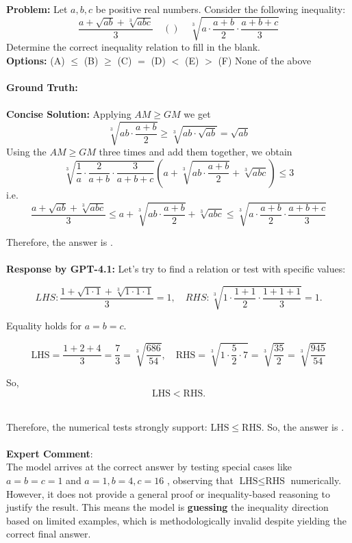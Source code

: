 \begin{examplebox}
\textbf{Problem:} Let $a, b, c$ be positive real numbers. Consider the following inequality:
$$
\frac{a+\sqrt{a b}+\sqrt[3]{a b c}}{3} \quad () \quad \sqrt[3]{a \cdot \frac{a+b}{2} \cdot \frac{a+b+c}{3}}
$$
Determine the correct inequality relation to fill in the blank.\\
\textbf{Options:} (A) $\leq$ \quad(B) $\geq$ \quad (C) $=$  \quad (D) $<$ \quad  (E) $>$  \quad (F) None of the above
\\\\
\textbf{Ground Truth:} 
\\\\
\textbf{Concise Solution:} Applying $A M \geq G M$ we get$$\sqrt[3]{a b \cdot \frac{a+b}{2}} \geq \sqrt[3]{a b \cdot \sqrt{a b}}=\sqrt{a b}$$
Using the $A M \geq G M$ three times and add them together, we obtain $$\sqrt[3]{\frac{1}{a} \cdot \frac{2}{a+b} \cdot \frac{3}{a+b+c}}\left(a+\sqrt[3]{a b \cdot \frac{a+b}{2}}+\sqrt[3]{a b c}\right) \leq 3$$
i.e.$$\frac{a+\sqrt{a b}+\sqrt[3]{a b c}}{3}\leq a+\sqrt[3]{a b \cdot \frac{a+b}{2}}+\sqrt[3]{a b c} \leq  \sqrt[3]{a \cdot \frac{a+b}{2} \cdot \frac{a+b+c}{3}}$$

Therefore, the answer is .
\\\\
\textbf{Response by GPT-4.1:} Let's try to find a relation or test with specific values:


\[
LHS: \frac{1 + \sqrt{1 \cdot 1} + \sqrt[3]{1 \cdot 1 \cdot 1}}{3}  = 1, \quad
RHS: \sqrt[3]{1 \cdot \frac{1+1}{2} \cdot \frac{1+1+1}{3}} = 1.
\]

Equality holds for \(a=b=c\).


\[
\text{LHS} = \frac{1 + 2 + 4}{3} = \frac{7}{3} = \sqrt[3]{\frac{686}{54}},
\quad
\text{RHS} = \sqrt[3]{1 \cdot \frac{5}{2} \cdot 7} = \sqrt[3]{\frac{35}{2}} = \sqrt[3]{\frac{945}{54}}
\]

\quad So,
\[
\text{LHS} < \text{RHS}.
\]

\\

Therefore, the numerical tests strongly support:
$
\text{LHS} \leq \text{RHS}.
$
So, the answer is .
\\\\
\textbf{Expert Comment}: \\
The model arrives at the correct answer by testing special cases like $a = b = c = 1$ and $a = 1, b = 4, c = 16$ \wronghl, observing that $\text{LHS} \leq \text{RHS}$ numerically. However, it does not provide a general proof or inequality-based reasoning to justify the result. This means the model is \textbf{guessing} the inequality direction based on limited examples, which is methodologically invalid despite yielding the correct final answer.
\end{examplebox}

